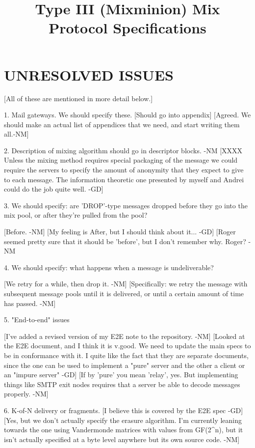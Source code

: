 \title{Type III (Mixminion) Mix Protocol Specifications}

\section{UNRESOLVED ISSUES}

[All of these are mentioned in more detail below.]

1. Mail gateways. We should specify these.
   [Should go into appendix]
   [Agreed.  We should make an actual list of appendices that we
    need, and start writing them all.-NM]

2. Description of mixing algorithm should go in descriptor blocks. -NM
   [XXXX Unless the mixing method requires special packaging of the message 
         we could require the servers to specify the amount of anonymity that
         they expect to give to each message. The information theoretic one
         presented by myself and Andrei could do the job quite well. -GD]

3. We should specify: are 'DROP'-type messages dropped before they go
    into the mix pool, or after they're pulled from the pool?

  [Before. -NM]
  [My feeling is After, but I should think about it... -GD]
  [Roger seemed pretty sure that it should be 'before', but I don't
   remember why.  Roger? -NM

4. We should specify: what happens when a message is undeliverable?

  [We retry for a while, then drop it. -NM]
  [Specifically: we retry the message with subsequent message pools
   until it is delivered, or until a certain amount of time has
   passed. -NM]

5. "End-to-end" issues

  [I've added a revised version of my E2E note to the repository. -NM]
  [Looked at the E2E document, and I think it is v.good. We need to update 
   the main specs to be in conformance with it. I quite like the fact that 
   they are separate documents, since the one can be used to implement a
   "pure" server and the other a client or an "impure server" -GD]
  [If by 'pure' you mean 'relay', yes.  But implementing things like
   SMTP exit nodes requires that a server be able to decode messages
   properly. -NM]

6. K-of-N delivery or fragments.
    [I believe this is covered by the E2E spec -GD]
    [Yes, but we don't actually specify the erasure algorithm.  I'm
     currently leaning towards the one using Vandermonde matrices with
     values from GF(2^n), but it isn't actually specified at a byte
    level anywhere but its own source code. -NM]

